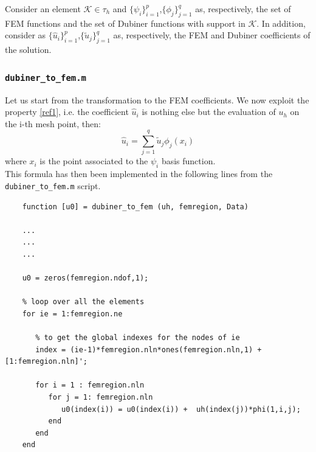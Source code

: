 \documentclass[a4paper,11pt]{article}
\begin{document}
	\noindent Consider an element $\mathcal{K}\in \tau_h$ and $\{\psi_{i}\}_{i=1}^{p}$,$\{\phi_{j}\}_{j=1}^{q}$ as, respectively, the set of FEM functions and the set of Dubiner functions with support in $\mathcal{K}$. In addition, consider as $\{\hat{u}_i\}_{i=1}^p$,$\{\tilde{u}_j\}_{j=1}^q$ as, respectively, the FEM and Dubiner coefficients of the solution. \vspace{5mm}
	
	\subsubsection{\texttt{dubiner\_to\_fem.m}}
	\noindent Let us start from the transformation to the FEM coefficients. We now exploit the property \ref{ref1}, i.e. the coefficient $\hat{u}_i$ is nothing else but the evaluation of $u_h$ on the i-th mesh point, then: 
	\begin{equation} \label{ref3}
	\hat{u}_i = \sum_{j=1}^q \tilde{u}_j\phi_j(x_i)
	\end{equation}
	where $x_i$ is the point associated to the $\psi_i$ basis function. \vspace{5mm} \\
	This formula has then been implemented in the following lines from the \texttt{dubiner\_to\_fem.m} script. 
	\begin{verbatim}
	function [u0] = dubiner_to_fem (uh, femregion, Data)  
	
	...
	...
	...
	
	u0 = zeros(femregion.ndof,1);
	
	% loop over all the elements
	for ie = 1:femregion.ne
	
	   % to get the global indexes for the nodes of ie 
	   index = (ie-1)*femregion.nln*ones(femregion.nln,1) + [1:femregion.nln]';
	
	   for i = 1 : femregion.nln
	      for j = 1: femregion.nln
	         u0(index(i)) = u0(index(i)) +  uh(index(j))*phi(1,i,j);
	      end
	   end
	end
	\end{verbatim} \vspace{4mm}
\end{document}
